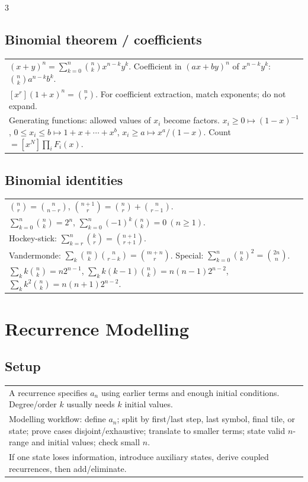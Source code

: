 \documentclass[10pt]{article}
\begin{document}
\begin{multicols*}{3}
\subsection*{Binomial theorem / coefficients}
\begin{tabular}{@{}p{}@{}}
\((x+y)^n=\sum_{k=0}^{n}\binom nk x^{n-k}y^k\). Coefficient in \((ax+by)^n\) of \(x^{n-k}y^k\): \(\binom nk a^{n-k}b^k\).\\
\([x^r](1+x)^n=\binom nr\). For coefficient extraction, match exponents; do not expand.\\
Generating functions: allowed values of \(x_i\) become factors. \(x_i\ge0\mapsto(1-x)^{-1}\), \(0\le x_i\le b\mapsto1+x+\cdots+x^b\), \(x_i\ge a\mapsto x^a/(1-x)\). Count \(=[x^N]\prod_i F_i(x)\).\\
\end{tabular}

\subsection*{Binomial identities}
\begin{tabular}{@{}p{}@{}}
\(\binom nr=\binom n{n-r}\), \(\binom{n+1}{r}=\binom nr+\binom n{r-1}\).\\
\(\sum_{k=0}^{n}\binom nk=2^n\), \(\sum_{k=0}^{n}(-1)^k\binom nk=0\ (n\ge1)\).\\
Hockey-stick: \(\sum_{k=r}^{n}\binom kr=\binom{n+1}{r+1}\).\\
Vandermonde: \(\sum_k\binom mk\binom n{r-k}=\binom{m+n}{r}\). Special: \(\sum_{k=0}^{n}\binom nk^2=\binom{2n}{n}\).\\
\(\sum_k k\binom nk=n2^{n-1}\), \(\sum_k k(k-1)\binom nk=n(n-1)2^{n-2}\), \(\sum_k k^2\binom nk=n(n+1)2^{n-2}\).\\
\end{tabular}

\section*{Recurrence Modelling}
\subsection*{Setup}
\begin{tabular}{@{}p{}@{}}
A recurrence specifies \(a_n\) using earlier terms and enough initial conditions. Degree/order \(k\) usually needs \(k\) initial values.\\
Modelling workflow: define \(a_n\); split by first/last step, last symbol, final tile, or state; prove cases disjoint/exhaustive; translate to smaller terms; state valid \(n\)-range and initial values; check small \(n\).\\
If one state loses information, introduce auxiliary states, derive coupled recurrences, then add/eliminate.\\
\end{tabular}


\end{multicols*}
\end{document}
